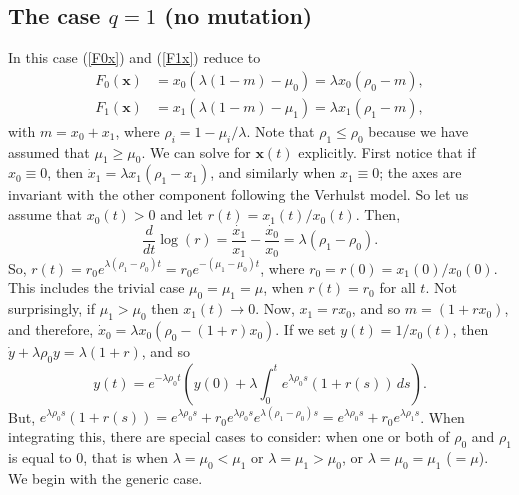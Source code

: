 \documentclass[12pt]{article}
\newcommand{\bx}{\boldsymbol{x}}
\begin{document}
\subsection{The case $q=1$ (no mutation)}
\label{qequalto1}

In this case (\ref{F0x}) and (\ref{F1x}) reduce to
\begin{align*}
F_0(\bx) &= x_0(\lambda(1-m)-\mu_0) = \lambda x_0 (\rho_0-m),
\\
F_1(\bx) &= x_1(\lambda(1-m)-\mu_1) = \lambda x_1 (\rho_1-m),
\end{align*}
with $m=x_0+x_1$, where $\rho_i=1-\mu_i/\lambda$.
Note that $\rho_1\leq \rho_0$ because
we have assumed that $\mu_1\geq \mu_0$.
We can solve for $\bx(t)$ explicitly.
First notice that if $x_0\equiv 0$, then
$\dot x_1 = \lambda x_1 (\rho_1-x_1)$,
and similarly when $x_1\equiv 0$;
the axes are invariant with the other component following 
the Verhulst model.
So let us assume that $x_0(t)>0$ and let $r(t)=x_1(t)/x_0(t)$. Then,
$$ 
\frac{d}{dt} \log(r) 
= \frac{\dot{x_1}}{x_1} - \frac{\dot{x_0}}{x_0} =
\lambda(\rho_1-\rho_0).
$$
So, $r(t) =r_0 e^{\lambda (\rho_1-\rho_0)t} =r_0 e^{-(\mu_1-\mu_0)t}$,
where $r_0=r(0)=x_1(0)/x_0(0)$. This includes the trivial case
$\mu_0=\mu_1=\mu$, when $r(t)=r_0$ for all $t$. 
Not surprisingly, if $\mu_1>\mu_0$ then $x_1(t)\to 0$.
Now, $x_1=r x_0$, and so $m=(1+rx_0)$,
and therefore, $\dot x_0 = \lambda x_0 (\rho_0-(1+r)x_0)$.
If we set $y(t)=1/x_0(t)$, then $\dot{y} +\lambda \rho_0 y =\lambda(1+r)$,
and so
$$
y(t)= e^{-\lambda\rho_0 t}
\left( y(0) + \lambda \int_0^t e^{\lambda\rho_0 s}(1+r(s)) \, ds\right).
$$
But,
$e^{\lambda\rho_0 s}(1+r(s))
=
e^{\lambda\rho_0 s}+ r_0 e^{\lambda\rho_0 s} e^{\lambda(\rho_1-\rho_0) s}
=
e^{\lambda\rho_0 s}+ r_0 e^{\lambda\rho_1 s}$.
When integrating this, there are special cases to consider: when one
or both of $\rho_0$ and $\rho_1$ is equal to $0$, that is when
$\lambda=\mu_0< \mu_1$ or $\lambda=\mu_1 > \mu_0$, 
or $\lambda=\mu_0=\mu_1$ ($=\mu$). We begin with the generic case.
\end{document}
